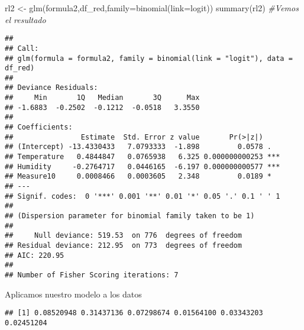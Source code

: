 \documentclass[
]{article}
\newenvironment{Shaded}{\begin{snugshade}}{\end{snugshade}}
\newcommand{\AttributeTok}[1]{\textcolor[rgb]{0.77,0.63,0.00}{#1}}
\newcommand{\CommentTok}[1]{\textcolor[rgb]{0.56,0.35,0.01}{\textit{#1}}}
\newcommand{\FunctionTok}[1]{\textcolor[rgb]{0.00,0.00,0.00}{#1}}
\newcommand{\NormalTok}[1]{#1}
\newcommand{\OtherTok}[1]{\textcolor[rgb]{0.56,0.35,0.01}{#1}}
\newcommand{\SpecialCharTok}[1]{\textcolor[rgb]{0.00,0.00,0.00}{#1}}
\newcommand{\StringTok}[1]{\textcolor[rgb]{0.31,0.60,0.02}{#1}}
\begin{document}
\begin{Shaded}
\begin{Highlighting}[]
\NormalTok{rl2 }\OtherTok{\textless{}{-}} \FunctionTok{glm}\NormalTok{(formula2,df\_red,}\AttributeTok{family=}\FunctionTok{binomial}\NormalTok{(}\AttributeTok{link=}\StringTok{\textquotesingle{}logit\textquotesingle{}}\NormalTok{))}
\FunctionTok{summary}\NormalTok{(rl2) }\CommentTok{\#Vemos el resultado}
\end{Highlighting}
\end{Shaded}

\begin{verbatim}
## 
## Call:
## glm(formula = formula2, family = binomial(link = "logit"), data = df_red)
## 
## Deviance Residuals: 
##     Min       1Q   Median       3Q      Max  
## -1.6883  -0.2502  -0.1212  -0.0518   3.3550  
## 
## Coefficients:
##                Estimate  Std. Error z value       Pr(>|z|)    
## (Intercept) -13.4330433   7.0793333  -1.898         0.0578 .  
## Temperature   0.4844847   0.0765938   6.325 0.000000000253 ***
## Humidity     -0.2764717   0.0446165  -6.197 0.000000000577 ***
## Measure10     0.0008466   0.0003605   2.348         0.0189 *  
## ---
## Signif. codes:  0 '***' 0.001 '**' 0.01 '*' 0.05 '.' 0.1 ' ' 1
## 
## (Dispersion parameter for binomial family taken to be 1)
## 
##     Null deviance: 519.53  on 776  degrees of freedom
## Residual deviance: 212.95  on 773  degrees of freedom
## AIC: 220.95
## 
## Number of Fisher Scoring iterations: 7
\end{verbatim}

Aplicamos nuestro modelo a los datos

\begin{Shaded}
\end{Shaded}

\begin{verbatim}
## [1] 0.08520948 0.31437136 0.07298674 0.01564100 0.03343203 0.02451204
\end{verbatim}

\begin{Shaded}
\end{Shaded}
\end{document}
